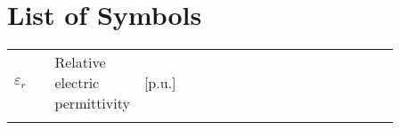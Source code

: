 \chapter*{List of Symbols}

\noindent
\pagestyle{fancy}

\begin{longtable}{l l l p{0.86\linewidth}}
$\varepsilon_r$ &   & Relative electric permittivity &[p.u.]\\\\

\end{longtable} 